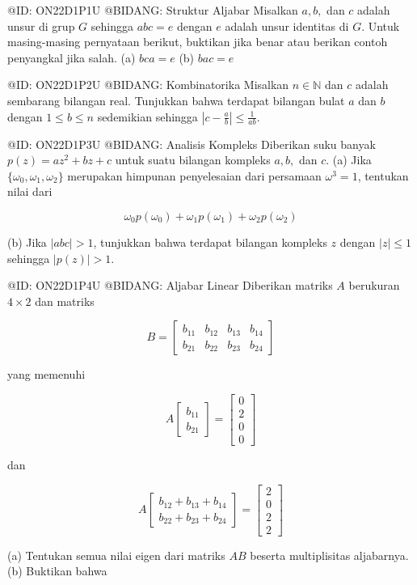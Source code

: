 @ID: ON22D1P1U
@BIDANG: Struktur Aljabar
Misalkan $a, b,$ dan $c$ adalah unsur di grup $G$ sehingga $abc=e$ dengan $e$ adalah unsur identitas di $G$. Untuk masing-masing pernyataan berikut, buktikan jika benar atau berikan contoh penyangkal jika salah.
(a) $bca=e$
(b) $bac=e$

@ID: ON22D1P2U
@BIDANG: Kombinatorika
Misalkan $n\in\mathbb{N}$ dan $c$ adalah sembarang bilangan real. Tunjukkan bahwa terdapat bilangan bulat $a$ dan $b$ dengan $1\le b\le n$ sedemikian sehingga $|c-\frac{a}{b}|\le\frac{1}{ab}$.

@ID: ON22D1P3U
@BIDANG: Analisis Kompleks
Diberikan suku banyak $p(z)=az^{2}+bz+c$ untuk suatu bilangan kompleks $a, b,$ dan $c$.
(a) Jika $\{\omega_{0},\omega_{1},\omega_{2}\}$ merupakan himpunan penyelesaian dari persamaan $\omega^{3}=1$, tentukan nilai dari

$$
\omega_{0}p(\omega_{0})+\omega_{1}p(\omega_{1})+\omega_{2}p(\omega_{2})
$$

(b) Jika $|abc|>1$, tunjukkan bahwa terdapat bilangan kompleks $z$ dengan $|z|\le1$ sehingga $|p(z)|>1$.

@ID: ON22D1P4U
@BIDANG: Aljabar Linear
Diberikan matriks $A$ berukuran $4\times2$ dan matriks

$$
B=\begin{bmatrix}b_{11}&b_{12}&b_{13}&b_{14}\\ b_{21}&b_{22}&b_{23}&b_{24}\end{bmatrix}
$$

yang memenuhi

$$
A\begin{bmatrix}b_{11}\\ b_{21}\end{bmatrix}=\begin{bmatrix}0\\ 2\\ 0\\ 0\end{bmatrix}
$$

dan

$$
A\begin{bmatrix}b_{12}+b_{13}+b_{14}\\ b_{22}+b_{23}+b_{24}\end{bmatrix}=\begin{bmatrix}2\\ 0\\ 2\\ 2\end{bmatrix}
$$

(a) Tentukan semua nilai eigen dari matriks $AB$ beserta multiplisitas aljabarnya.
(b) Buktikan bahwa

